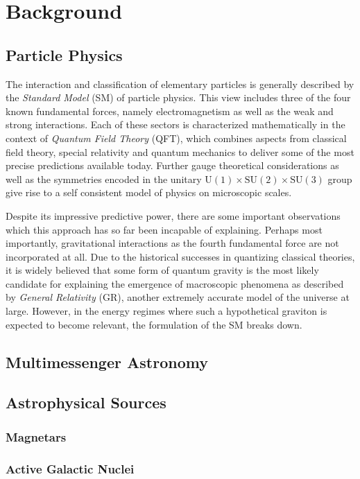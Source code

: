 \chapter{Background}
\label{ch:background}

\section{Particle Physics}
\label{sec:particle}

The interaction and classification of elementary particles is generally described by the \emph{Standard Model} (SM) of particle physics. This
view includes three of the four known fundamental forces, namely electromagnetism as well as the weak and strong interactions. Each of these
sectors is characterized mathematically in the context of \emph{Quantum Field Theory} (QFT), which combines aspects from classical field theory,
special relativity and quantum mechanics to deliver some of the most precise predictions available today. Further gauge theoretical considerations
as well as the symmetries encoded in the unitary $\text{U}(1) \times \text{SU}(2) \times \text{SU}(3)$ group give rise to a self consistent model
of physics on microscopic scales.

Despite its impressive predictive power, there are some important observations which this approach has so far been incapable of explaining.
Perhaps most importantly, gravitational interactions as the fourth fundamental force are not incorporated at all. Due to the historical successes
in quantizing classical theories, it is widely believed that some form of quantum gravity is the most likely candidate for explaining the emergence
of macroscopic phenomena as described by \emph{General Relativity} (GR), another extremely accurate model of the universe at large.
However, in the energy regimes where such a hypothetical graviton is expected to become relevant, the formulation of the SM breaks down.


\section{Multimessenger Astronomy}
\label{sec:multimessenger}

\section{Astrophysical Sources}
\label{sec:sources}

\subsection*{Magnetars}
\label{sub:magnetars}

\subsection*{Active Galactic Nuclei}
\label{sub:agn}

